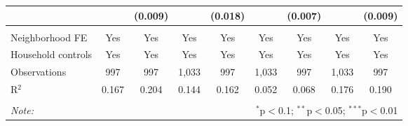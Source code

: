 \begin{table}[H]
\begin{tabular}{@{\extracolsep{-7pt}}lcccccccc}
  &  & (0.009) &  & (0.018) &  & (0.007) &  & (0.009) \\ 
 \hline \\[-1.8ex] 
Neighborhood FE & Yes & Yes & Yes & Yes & Yes & Yes & Yes & Yes \\ 
Household controls & Yes & Yes & Yes & Yes & Yes & Yes & Yes & Yes \\ 
Observations & 997 & 997 & 1,033 & 997 & 1,033 & 997 & 1,033 & 997 \\ 
R$^{2}$ & 0.167 & 0.204 & 0.144 & 0.162 & 0.052 & 0.068 & 0.176 & 0.190 \\ 
\hline 
\hline \\[-1.8ex] 
\textit{Note:}  & \multicolumn{8}{r}{$^{*}$p$<$0.1; $^{**}$p$<$0.05; $^{***}$p$<$0.01} \\ 
\end{tabular} 
\end{table} 
